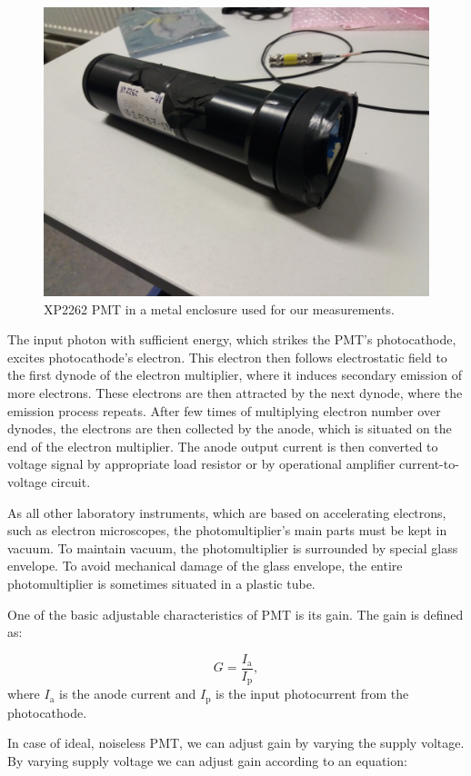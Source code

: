 \begin{figure}[H]
 \centering
 \includegraphics[scale = 0.08, angle = 180]{./pictures/XP2262}
 \caption{XP2262 PMT in a metal enclosure used for our measurements.}
 \label{XP2262 PMT}
\end{figure}

\par
The input photon with sufficient energy, which strikes the PMT's photocathode, excites photocathode's electron. This electron then follows electrostatic field to the first dynode of the electron multiplier, where it induces secondary emission of more electrons. These electrons are then attracted by the next dynode, where the emission process repeats. After few times of multiplying electron number over dynodes, the electrons are then collected by 
the anode, which is situated on the end of the electron multiplier. The anode output current is then converted to voltage signal by appropriate load resistor or by operational amplifier current-to-voltage circuit.
\par
As all other laboratory instruments, which are based on accelerating electrons, such as electron microscopes, the photomultiplier's main parts must be kept in vacuum. To maintain vacuum, the photomultiplier is surrounded by special glass envelope. To avoid mechanical damage of the glass envelope, the entire photomultiplier is sometimes situated in a plastic tube.
\par
One of the basic adjustable characteristics of PMT is its gain. The gain is defined as:

\begin{equation}
G = \frac{I_\textrm{a}}{I_\textrm{p}},
\end{equation}
where $I_\textrm{a}$ is the anode current and $I_\textrm{p}$ is the input photocurrent from the photocathode.
\par
In case of ideal, noiseless PMT, we can adjust gain by varying the supply voltage. By varying supply voltage we can adjust gain according to an equation:

